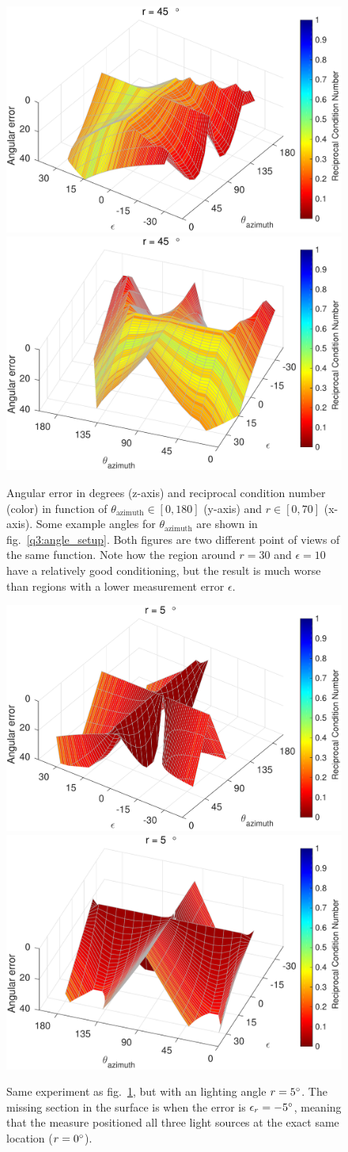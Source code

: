 \documentclass{report}
\begin{document}
\begin{figure}
  \centering
  \includegraphics[width=0.45\linewidth]{q3_experiment_2_view_1.pdf}
  \includegraphics[width=0.45\linewidth]{q3_experiment_2_view_2.pdf}
  \caption[Experiment 2]
   {Angular error in degrees (z-axis) and reciprocal condition number (color) in function of $\theta_{\text{azimuth}} \in \left[0, 180\right]$ (y-axis) and $r \in \left[0, 70\right]$ (x-axis). Some example angles for $\theta_{\text{azimuth}}$ are shown in fig.~\ref{q3:angle_setup}. Both figures are two different point of views of the same function. Note how the region around $r = 30$ and $\epsilon = 10$ have a relatively good conditioning, but the result is much worse than regions with a lower measurement error $\epsilon$.}
  \label{q3:exp2}
\end{figure}

\begin{figure}
  \centering
  \includegraphics[width=0.45\linewidth]{q3_experiment_2a_view_1.pdf}
  \includegraphics[width=0.45\linewidth]{q3_experiment_2a_view_2.pdf}
  \caption[Experiment 2 on a small lighting angle]
   {Same experiment as fig.~\ref{q3:exp2}, but with an lighting angle $r = 5\degree$. The missing section in the surface is when the error is $\epsilon_r = -5\degree$, meaning that the measure positioned all three light sources at the exact same location ($r = 0\degree$).}
  \label{q3:exp2a}
\end{figure}
\end{document}
